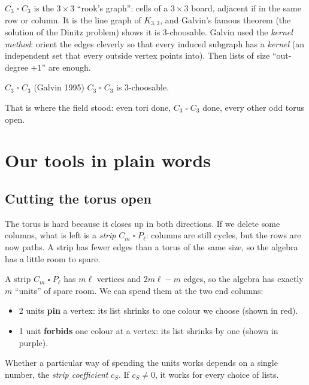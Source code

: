 \documentclass[11pt,oneside,openany]{book}
\newcommand{\T}{\mathbin{\square}}
\begin{document}
$C_3 \T C_3$ is the $3 \times 3$ ``rook's graph'': cells of a $3\times 3$ board, adjacent if in the
same row or column. It is the line graph of $K_{3,3}$, and Galvin's famous theorem (the solution of
the Dinitz problem) shows it is 3-choosable. Galvin used the \emph{kernel method}: orient the
edges cleverly so that every induced subgraph has a \emph{kernel} (an independent set that every
outside vertex points into). Then lists of size ``out-degree $+1$'' are enough.

\begin{proved}{$C_3 \T C_3$ (Galvin 1995)}
$C_3 \T C_3$ is 3-choosable.
\end{proved}

That is where the field stood: even tori done, $C_3 \T C_3$ done, every other odd torus open.

\chapter{Our tools in plain words}

\section{Cutting the torus open}

The torus is hard because it closes up in both directions. If we delete some columns, what is
left is a \emph{strip} $C_m \T P_\ell$: columns are still cycles, but the rows are now paths. A
strip has fewer edges than a torus of the same size, so the algebra has a little room to spare.

\begin{keyidea}
A strip $C_m \T P_\ell$ has $m\ell$ vertices and $2m\ell - m$ edges, so the algebra has exactly
$m$ ``units'' of spare room. We can spend them at the two end columns:
\begin{itemize}
\item 2 units \textbf{pin} a vertex: its list shrinks to one colour we choose (shown in
\textcolor{pinc}{red}).
\item 1 unit \textbf{forbids} one colour at a vertex: its list shrinks by one
(shown in \textcolor{forbc}{purple}).
\end{itemize}
Whether a particular way of spending the units works depends on a single number, the
\emph{strip coefficient} $c_S$. If $c_S \neq 0$, it works for every choice of lists.
\end{keyidea}
\end{document}
